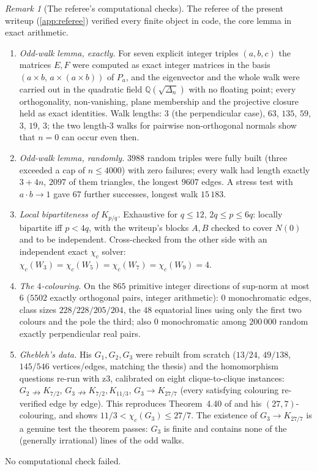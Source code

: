 \documentclass[11pt,a4paper]{article}
\theoremstyle{plain}
\theoremstyle{definition}
\theoremstyle{remark}
\newtheorem{remark}[theorem]{Remark}
\newcommand{\chic}{\chi_c}
\newcommand{\Kc}[2]{K_{#1/#2}}
\newcommand{\Pl}[1]{P_{#1}}
\begin{document}
\begin{remark}[The referee's computational checks]\label{rem:checks}
The referee of the present writeup (\cref{app:referee}) verified every finite object in code, the core lemma in exact arithmetic.
\begin{enumerate}[nosep]
\item \emph{Odd-walk lemma, exactly.} For seven explicit integer triples $(a,b,c)$ the matrices $E,F$ were computed as exact integer matrices in the basis $(a\times b,\,a\times(a\times b))$ of $\Pl a$, and the eigenvector and the whole walk were carried out in the quadratic field $\mathbb Q(\sqrt{\Delta_n})$ with no floating point; every orthogonality, non-vanishing, plane membership and the projective closure held as exact identities. Walk lengths: $3$ (the perpendicular case), $63$, $135$, $59$, $3$, $19$, $3$; the two length-$3$ walks for pairwise non-orthogonal normals show that $n=0$ can occur even then.
\item \emph{Odd-walk lemma, randomly.} $3988$ random triples were fully built (three exceeded a cap of $n\le4000$) with zero failures; every walk had length exactly $3+4n$, $2097$ of them triangles, the longest $9607$ edges. A stress test with $a\cdot b\to1$ gave $67$ further successes, longest walk $15\,183$.
\item \emph{Local bipartiteness of $\Kc pq$.} Exhaustive for $q\le12$, $2q\le p\le6q$: locally bipartite iff $p<4q$, with the writeup's blocks $A,B$ checked to cover $N(0)$ and to be independent. Cross-checked from the other side with an independent exact $\chic$ solver: $\chic(W_3)=\chic(W_5)=\chic(W_7)=\chic(W_9)=4$.
\item \emph{The $4$-colouring.} On the $865$ primitive integer directions of sup-norm at most $6$ ($5502$ exactly orthogonal pairs, integer arithmetic): $0$ monochromatic edges, class sizes $228/228/205/204$, the $48$ equatorial lines using only the first two colours and the pole the third; also $0$ monochromatic among $200\,000$ random exactly perpendicular real pairs.
\item \emph{Ghebleh's data.} His $G_1,G_2,G_3$ were rebuilt from scratch ($13/24$, $49/138$, $145/546$ vertices/edges, matching the thesis) and the homomorphism questions re-run with z3, calibrated on eight clique-to-clique instances: $G_2\nrightarrow\Kc72$, $G_3\nrightarrow\Kc72,\Kc{11}3$, $G_3\to\Kc{27}7$ (every satisfying colouring re-verified edge by edge). This reproduces Theorem~4.40 of \cite{Ghebleh07} and his $(27,7)$-colouring, and shows $11/3<\chic(G_3)\le27/7$. The existence of $G_3\to\Kc{27}7$ is a genuine test the theorem passes: $G_3$ is finite and contains none of the (generally irrational) lines of the odd walks.
\end{enumerate}
No computational check failed.
\end{remark}
\end{document}
